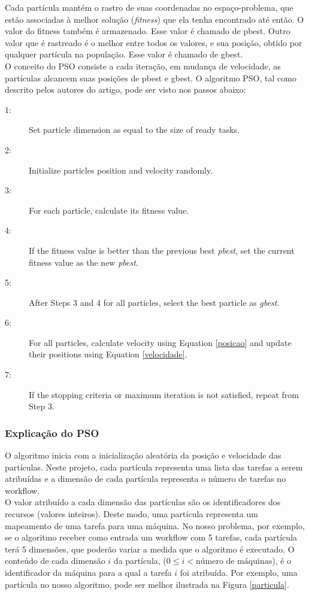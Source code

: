 \documentclass[a4paper,10pt]{article}
\begin{document}
Cada partícula mantém o rastro de suas coordenadas no espaço-problema, que estão associadas à 
melhor solução (\emph{fitness}) que ela tenha encontrado até então. O valor do fitness também é armazenado. 
Esse valor é chamado de pbest. Outro valor que é rastreado é o melhor entre todos os valores, e sua posição, 
obtido por qualquer partícula na população. Esse valor é chamado de gbest.\\

O conceito do PSO consiste a cada iteração, em mudança de velocidade, as partículas 
alcancem suas posições de pbest e gbest. O algoritmo PSO, tal como descrito pelos 
autores do artigo, pode ser visto nos passos abaixo:\\

\begin{description}
\item[1:] Set particle dimension as equal to the size of ready tasks.
\item[2:] Initialize particles position and velocity randomly.
\item[3:] For each particle, calculate its fitness value.
\item[4:] If the fitness value is better than the previous best \emph{pbest}, set the current fitness value as the new \emph{pbest}.
\item[5:] After Steps 3 and 4 for all particles, select the best particle as \emph{gbest}.
\item[6:] For all particles, calculate velocity using Equation \eqref{posicao} and update their positions using Equation \eqref{velocidade}.
\item[7:] If the stopping criteria or maximum iteration is not satisfied, repeat from Step 3.
\end{description}



\subsubsection{Explicação do PSO}

O algoritmo inicia com a inicialização aleatória da posição e velocidade das partículas. Neste projeto, 
cada partícula representa uma lista das tarefas a serem atribuídas e a dimensão de cada partícula 
representa o número de tarefas no workflow.\\

O valor atribuído a cada dimensão das partículas são os identificadores dos recursos (valores inteiros). Deste modo, 
uma partícula representa um mapeamento de uma tarefa para uma máquina. No nosso problema, por exemplo, se o 
algoritmo receber como entrada um workflow com 5 tarefas, cada partícula terá 5 dimensões, que poderão variar 
a medida que o algoritmo é executado. O conteúdo de cada dimensão $i$ da partícula, ($0 \leq i < \text{número de máquinas}$), 
é o identificador da máquina para a qual a tarefa $i$ foi atribuída. Por exemplo, uma partícula no nosso algoritmo, 
pode ser melhor ilustrada na Figura \eqref{particula}.\\
\end{document}
